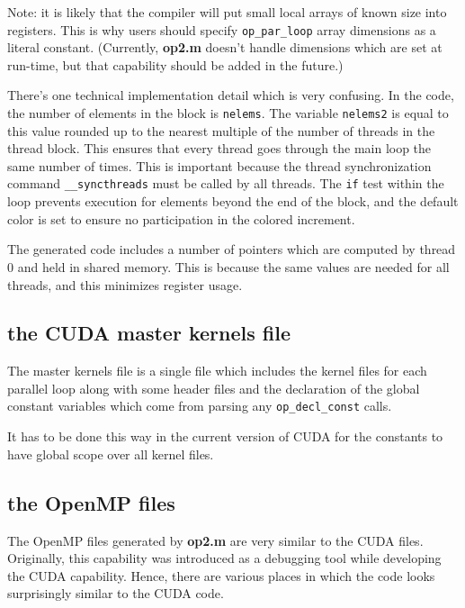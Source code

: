 \documentclass[12pt]{article}
\begin{document}

Note: it is likely that the compiler will put small local arrays of 
known size into registers.  This is why users should specify
{\tt op\_par\_loop} array dimensions as a literal constant.
(Currently, {\bf op2.m} doesn't handle dimensions which are set at 
run-time, but that capability should be added in the future.)

There's one technical implementation detail which is very confusing.
In the code, the number of elements in the block is {\tt nelems}.
The variable {\tt nelems2} is equal to this value rounded up to the 
nearest multiple of the number of threads in the thread block.
This ensures that every thread goes through the main loop the same 
number of times.  This is important because the thread synchronization 
command {\tt \_\_syncthreads} must be called by all threads.
The {\tt if} test within the loop prevents execution for elements
beyond the end of the block, and the default color is set to ensure
no participation in the colored increment.

The generated code includes a number of pointers which are computed 
by thread 0 and held in shared memory.  This is because the same values 
are needed for all threads, and this minimizes register usage.

\subsection{the CUDA master kernels file}

The master kernels file is a single file which includes the kernel 
files for each parallel loop along with some header files and the 
declaration of the global constant variables which come from parsing 
any {\tt op\_decl\_const} calls.

It has to be done this way in the current version of CUDA for the 
constants to have global scope over all kernel files.


\subsection{the OpenMP files}

The OpenMP files generated by {\bf op2.m} are very similar to the
CUDA files.  Originally, this capability was introduced as a debugging 
tool while developing the CUDA capability.  Hence, there are various
places in which the code looks surprisingly similar to the CUDA code.
\end{document}
